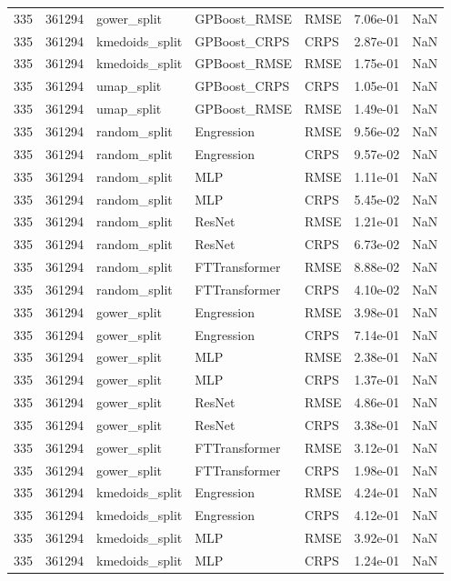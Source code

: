 \begin{tabular}{rrlllrr}
335 & 361294 & gower\_split & GPBoost\_RMSE & RMSE & 7.06e-01 & NaN \\
335 & 361294 & kmedoids\_split & GPBoost\_CRPS & CRPS & 2.87e-01 & NaN \\
335 & 361294 & kmedoids\_split & GPBoost\_RMSE & RMSE & 1.75e-01 & NaN \\
335 & 361294 & umap\_split & GPBoost\_CRPS & CRPS & 1.05e-01 & NaN \\
335 & 361294 & umap\_split & GPBoost\_RMSE & RMSE & 1.49e-01 & NaN \\
335 & 361294 & random\_split & Engression & RMSE & 9.56e-02 & NaN \\
335 & 361294 & random\_split & Engression & CRPS & 9.57e-02 & NaN \\
335 & 361294 & random\_split & MLP & RMSE & 1.11e-01 & NaN \\
335 & 361294 & random\_split & MLP & CRPS & 5.45e-02 & NaN \\
335 & 361294 & random\_split & ResNet & RMSE & 1.21e-01 & NaN \\
335 & 361294 & random\_split & ResNet & CRPS & 6.73e-02 & NaN \\
335 & 361294 & random\_split & FTTransformer & RMSE & 8.88e-02 & NaN \\
335 & 361294 & random\_split & FTTransformer & CRPS & 4.10e-02 & NaN \\
335 & 361294 & gower\_split & Engression & RMSE & 3.98e-01 & NaN \\
335 & 361294 & gower\_split & Engression & CRPS & 7.14e-01 & NaN \\
335 & 361294 & gower\_split & MLP & RMSE & 2.38e-01 & NaN \\
335 & 361294 & gower\_split & MLP & CRPS & 1.37e-01 & NaN \\
335 & 361294 & gower\_split & ResNet & RMSE & 4.86e-01 & NaN \\
335 & 361294 & gower\_split & ResNet & CRPS & 3.38e-01 & NaN \\
335 & 361294 & gower\_split & FTTransformer & RMSE & 3.12e-01 & NaN \\
335 & 361294 & gower\_split & FTTransformer & CRPS & 1.98e-01 & NaN \\
335 & 361294 & kmedoids\_split & Engression & RMSE & 4.24e-01 & NaN \\
335 & 361294 & kmedoids\_split & Engression & CRPS & 4.12e-01 & NaN \\
335 & 361294 & kmedoids\_split & MLP & RMSE & 3.92e-01 & NaN \\
335 & 361294 & kmedoids\_split & MLP & CRPS & 1.24e-01 & NaN \\

\end{tabular}
